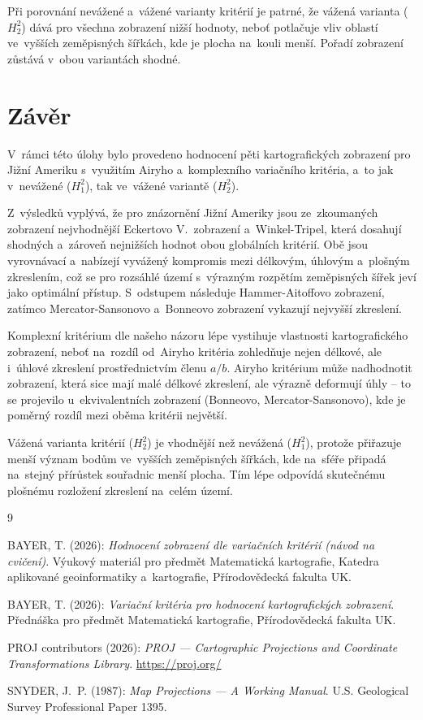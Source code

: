 \documentclass[11pt, a4paper]{article}
\begin{document}
Při porovnání nevážené a~vážené varianty kritérií je patrné, že vážená varianta ($H_2^2$) dává pro všechna zobrazení nižší hodnoty, neboť potlačuje vliv oblastí ve~vyšších zeměpisných šířkách, kde je plocha na~kouli menší. Pořadí zobrazení zůstává v~obou variantách shodné.

\newpage

\section{Závěr}

V~rámci této úlohy bylo provedeno hodnocení pěti kartografických zobrazení pro Jižní Ameriku s~využitím Airyho a~komplexního variačního kritéria, a~to jak v~nevážené ($H_1^2$), tak ve~vážené variantě ($H_2^2$).

Z~výsledků vyplývá, že pro znázornění Jižní Ameriky jsou ze~zkoumaných zobrazení nejvhodnější Eckertovo V.\ zobrazení a~Winkel-Tripel, která dosahují shodných a~zároveň nejnižších hodnot obou globálních kritérií. Obě jsou vyrovnávací a~nabízejí vyvážený kompromis mezi délkovým, úhlovým a~plošným zkreslením, což se pro rozsáhlé území s~výrazným rozpětím zeměpisných šířek  jeví jako optimální přístup. S~odstupem následuje Hammer-Aitoffovo zobrazení, zatímco Mercator-Sansonovo a~Bonneovo zobrazení vykazují nejvyšší zkreslení.

Komplexní kritérium dle našeho názoru lépe vystihuje vlastnosti kartografického zobrazení, neboť na~rozdíl od~Airyho kritéria zohledňuje nejen délkové, ale i~úhlové zkreslení prostřednictvím členu $a/b$. Airyho kritérium může nadhodnotit zobrazení, která sice mají malé délkové zkreslení, ale výrazně deformují úhly -- to se projevilo u~ekvivalentních zobrazení (Bonneovo, Mercator-Sansonovo), kde je poměrný rozdíl mezi oběma kritérii největší.

Vážená varianta kritérií ($H_2^2$) je vhodnější než nevážená ($H_1^2$), protože přiřazuje menší význam bodům ve~vyšších zeměpisných šířkách, kde na~sféře připadá na~stejný přírůstek souřadnic menší plocha. Tím lépe odpovídá skutečnému plošnému rozložení zkreslení na~celém území.

\newpage
\renewcommand{\refname}{Zdroje}
\begin{thebibliography}{9}

 BAYER, T. (2026): \textit{Hodnocení zobrazení dle variačních kritérií (návod na cvičení)}. Výukový materiál pro předmět Matematická kartografie, Katedra aplikované geoinformatiky a~kartografie, Přírodovědecká fakulta UK.

 BAYER, T. (2026): \textit{Variační kritéria pro hodnocení kartografických zobrazení}. Přednáška pro předmět Matematická kartografie, Přírodovědecká fakulta UK.

 PROJ contributors (2026): \textit{PROJ --- Cartographic Projections and Coordinate Transformations Library}. \url{https://proj.org/}

 SNYDER, J.~P. (1987): \textit{Map Projections --- A Working Manual}. U.S. Geological Survey Professional Paper 1395.

\end{thebibliography}
\end{document}
